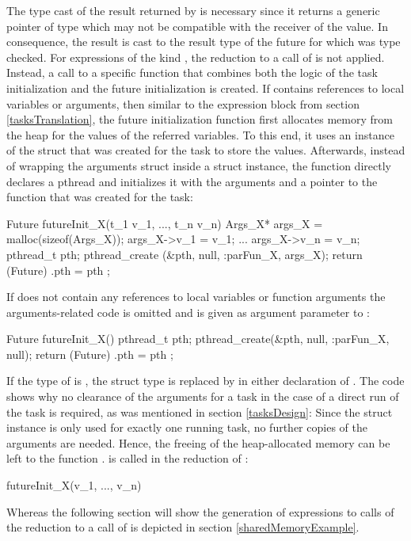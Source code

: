 The type cast of the result returned by  is necessary since it returns a generic pointer of type  which may not be compatible with the receiver of the value. In consequence, the result is cast to the result type of the future for which  was type checked. 
For expressions of the kind , the reduction to a call of  is not applied. Instead, a call to a specific function  that combines both the logic of the task initialization and the future initialization is created. If  contains references to local variables or arguments, then similar to the  expression block from section \ref{tasksTranslation}, the future initialization function first allocates memory from the heap for the values of the referred variables. To this end, it uses an instance of the  struct that was created for the task to store the values. Afterwards, instead of wrapping the arguments struct inside a  struct instance, the function directly declares a pthread and initializes it with the arguments and a pointer to the function  that was created for the task:
\begin{ccode}
Future futureInit_X(t_1 v_1, ..., t_n v_n) { 
  Args_X* args_X = malloc(sizeof(Args_X)); 
  args_X->v_1 = v_1; 
  ...
  args_X->v_n = v_n; 
  pthread_t pth; 
  pthread_create (&pth, null, :parFun_X, args_X); 
  return (Future){ .pth = pth }; 
}
\end{ccode}
If  does not contain any references to local variables or function arguments the arguments-related code is omitted and  is given as argument parameter to :
\begin{ccode}
Future futureInit_X() {
  pthread_t pth; 
  pthread_create(&pth, null, :parFun_X, null); 
  return (Future){ .pth = pth }; 
}
\end{ccode}
If the type of  is , the struct type  is replaced by  in either declaration of . The code shows why no clearance of the arguments for a task in the case of a direct run of the task is required, as was mentioned in section \ref{tasksDesign}: Since the struct instance  is only used for exactly one running task, no further copies of the arguments are needed. Hence, the freeing of the heap-allocated memory can be left to the function .  is called in the reduction of :
\begin{ccode}
futureInit_X(v_1, ..., v_n)
\end{ccode}
Whereas the following section will show the generation of expressions  to calls of  the reduction to a call of  is depicted in section \ref{sharedMemoryExample}.

